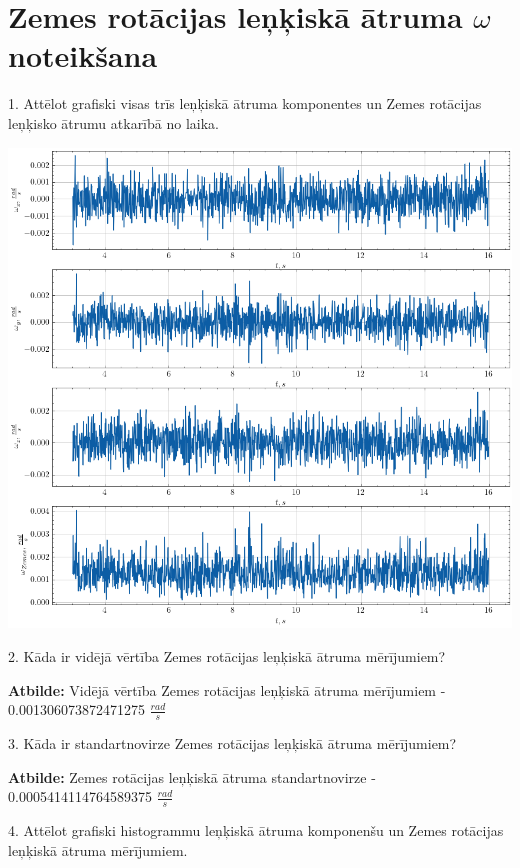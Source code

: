\documentclass[12pt]{article}
\newlength\tindent
\renewcommand{\indent}{\hspace*{\tindent}}
\begin{document}
\newpage
\section*{Zemes rotācijas leņķiskā ātruma $\omega$ noteikšana}

1.	Attēlot grafiski visas trīs leņķiskā ātruma komponentes un Zemes rotācijas leņķisko ātrumu atkarībā no laika.

\begin{center}
    \includegraphics[width=1\textwidth]{Zemes rotācijas leņķiskā ātruma noteikšana1.png}
\end{center}

2.	Kāda ir vidējā vērtība Zemes rotācijas leņķiskā ātruma mērījumiem?

\indent \textbf{Atbilde:} Vidējā vērtība Zemes rotācijas leņķiskā ātruma mērījumiem - 0.001306073872471275 $\frac{rad}{s}$

3.	Kāda ir standartnovirze Zemes rotācijas leņķiskā ātruma mērījumiem?

\indent \textbf{Atbilde:} Zemes rotācijas leņķiskā ātruma standartnovirze - 0.0005414114764589375 $\frac{rad}{s}$

4.	Attēlot grafiski histogrammu leņķiskā ātruma komponenšu un Zemes rotācijas leņķiskā ātruma mērījumiem.
\end{document}
